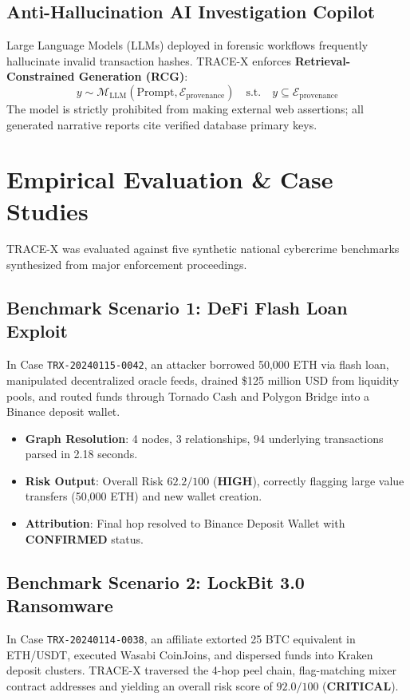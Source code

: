 \documentclass[10pt,twocolumn,a4paper]{article}
\begin{document}
\subsection{Anti-Hallucination AI Investigation Copilot}
Large Language Models (LLMs) deployed in forensic workflows frequently hallucinate invalid transaction hashes. TRACE-X enforces \textbf{Retrieval-Constrained Generation (RCG)}:
\begin{equation}
    y \sim \mathcal{M}_{\text{LLM}}(\text{Prompt}, \mathcal{E}_{\text{provenance}}) \quad \text{s.t.} \quad y \subseteq \mathcal{E}_{\text{provenance}}
\end{equation}
The model is strictly prohibited from making external web assertions; all generated narrative reports cite verified database primary keys.

\section{Empirical Evaluation \& Case Studies}
TRACE-X was evaluated against five synthetic national cybercrime benchmarks synthesized from major enforcement proceedings.

\subsection{Benchmark Scenario 1: DeFi Flash Loan Exploit}
In Case \texttt{TRX-20240115-0042}, an attacker borrowed 50,000 ETH via flash loan, manipulated decentralized oracle feeds, drained \$125 million USD from liquidity pools, and routed funds through Tornado Cash and Polygon Bridge into a Binance deposit wallet.
\begin{itemize}[leftmargin=*]
    \item \textbf{Graph Resolution}: 4 nodes, 3 relationships, 94 underlying transactions parsed in 2.18 seconds.
    \item \textbf{Risk Output}: Overall Risk $62.2 / 100$ (\textbf{HIGH}), correctly flagging large value transfers (50,000 ETH) and new wallet creation.
    \item \textbf{Attribution}: Final hop resolved to Binance Deposit Wallet with \textbf{CONFIRMED} status.
\end{itemize}

\subsection{Benchmark Scenario 2: LockBit 3.0 Ransomware}
In Case \texttt{TRX-20240114-0038}, an affiliate extorted 25 BTC equivalent in ETH/USDT, executed Wasabi CoinJoins, and dispersed funds into Kraken deposit clusters. TRACE-X traversed the 4-hop peel chain, flag-matching mixer contract addresses and yielding an overall risk score of $92.0 / 100$ (\textbf{CRITICAL}).
\end{document}
